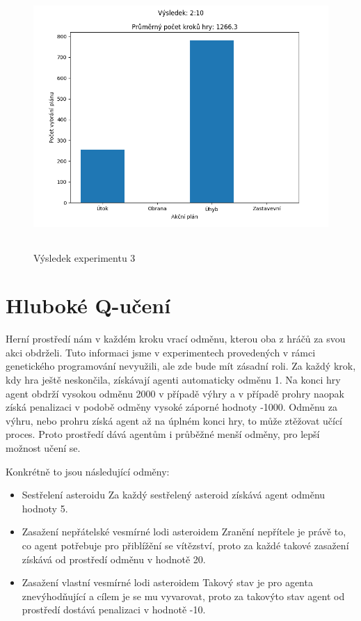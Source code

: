 \begin{figure}[H]\centering
\includegraphics[width=125mm, height=100mm]{./Obrazky/Experiment03Results.png}
\caption{Výsledek experimentu 3}
\label{Výsledek experimentu 03}
\end{figure}




\newpage
\section{Hluboké Q-učení}
Herní prostředí nám v každém kroku vrací odměnu, kterou oba z hráčů za svou akci obdrželi. Tuto informaci jsme v experimentech provedených v rámci genetického programování nevyužili, ale zde bude mít zásadní roli.
Za každý krok, kdy hra ještě neskončila, získávají agenti automaticky odměnu 1. Na konci hry agent obdrží vysokou odměnu 2000 v případě výhry a v případě prohry naopak získá penalizaci v podobě odměny vysoké záporné hodnoty -1000.
Odměnu za výhru, nebo prohru získá agent až na úplném konci hry, to může ztěžovat učící proces. Proto prostředí dává agentům i průběžné menší odměny, pro lepší možnost učení se.

Konkrétně to jsou následující odměny:
\begin{itemize}
    \item Sestřelení asteroidu
        \newline
        Za každý sestřelený asteroid získává agent odměnu hodnoty 5.
    \item Zasažení nepřátelské vesmírné lodi asteroidem 
        \newline
        Zranění nepřítele je právě to, co agent potřebuje pro přiblížění se vítězství, proto za každé takové zasažení získává od prostředí odměnu v hodnotě 20.
    \item Zasažení vlastní vesmírné lodi asteroidem
        \newline
        Takový stav je pro agenta znevýhodňující a cílem je se mu vyvarovat, proto za takovýto stav agent od prostředí dostává penalizaci v hodnotě -10.
\end{itemize}


